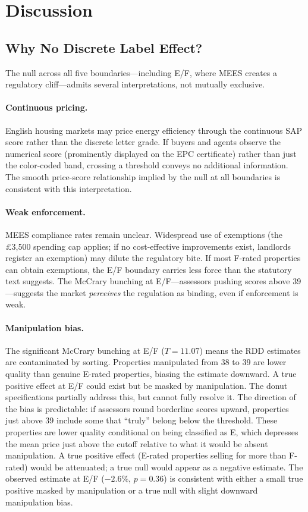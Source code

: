 \documentclass[12pt]{article}
\begin{document}
\section{Discussion}\label{sec:discussion}

\subsection{Why No Discrete Label Effect?}

The null across all five boundaries---including E/F, where MEES creates a regulatory cliff---admits several interpretations, not mutually exclusive.

\paragraph{Continuous pricing.} English housing markets may price energy efficiency through the continuous SAP score rather than the discrete letter grade. If buyers and agents observe the numerical score (prominently displayed on the EPC certificate) rather than just the color-coded band, crossing a threshold conveys no additional information. The smooth price-score relationship implied by the null at all boundaries is consistent with this interpretation.

\paragraph{Weak enforcement.} MEES compliance rates remain unclear. Widespread use of exemptions (the \pounds 3,500 spending cap applies; if no cost-effective improvements exist, landlords register an exemption) may dilute the regulatory bite. If most F-rated properties can obtain exemptions, the E/F boundary carries less force than the statutory text suggests. The McCrary bunching at E/F---assessors pushing scores above 39---suggests the market \textit{perceives} the regulation as binding, even if enforcement is weak.

\paragraph{Manipulation bias.} The significant McCrary bunching at E/F ($T = 11.07$) means the RDD estimates are contaminated by sorting. Properties manipulated from 38 to 39 are lower quality than genuine E-rated properties, biasing the estimate downward. A true positive effect at E/F could exist but be masked by manipulation. The donut specifications partially address this, but cannot fully resolve it. The direction of the bias is predictable: if assessors round borderline scores upward, properties just above 39 include some that ``truly'' belong below the threshold. These properties are lower quality conditional on being classified as E, which depresses the mean price just above the cutoff relative to what it would be absent manipulation. A true positive effect (E-rated properties selling for more than F-rated) would be attenuated; a true null would appear as a negative estimate. The observed estimate at E/F ($-2.6\%$, $p = 0.36$) is consistent with either a small true positive masked by manipulation or a true null with slight downward manipulation bias.
\end{document}

